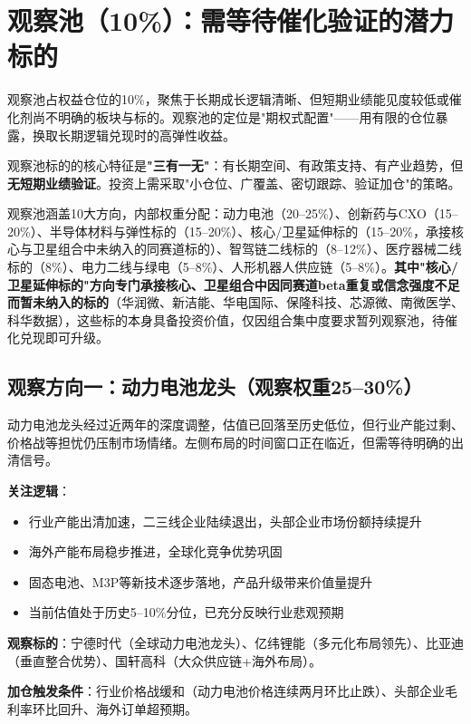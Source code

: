 \section{观察池（10\%）：需等待催化验证的潜力标的}

观察池占权益仓位的10\%，聚焦于长期成长逻辑清晰、但短期业绩能见度较低或催化剂尚不明确的板块与标的。观察池的定位是"期权式配置"——用有限的仓位暴露，换取长期逻辑兑现时的高弹性收益。

观察池标的的核心特征是\textbf{"三有一无"}：有长期空间、有政策支持、有产业趋势，但\textbf{无短期业绩验证}。投资上需采取"小仓位、广覆盖、密切跟踪、验证加仓"的策略。

观察池涵盖10大方向，内部权重分配：动力电池（20--25\%）、创新药与CXO（15--20\%）、半导体材料与弹性标的（15--20\%）、核心/卫星延伸标的（15--20\%，承接核心与卫星组合中未纳入的同赛道标的）、智驾链二线标的（8--12\%）、医疗器械二线标的（8\%）、电力二线与绿电（5--8\%）、人形机器人供应链（5--8\%）。\textbf{其中"核心/卫星延伸标的"方向专门承接核心、卫星组合中因同赛道beta重复或信念强度不足而暂未纳入的标的}（华润微、新洁能、华电国际、保隆科技、芯源微、南微医学、科华数据），这些标的本身具备投资价值，仅因组合集中度要求暂列观察池，待催化兑现即可升级。

\subsection{观察方向一：动力电池龙头（观察权重25--30\%）}

动力电池龙头经过近两年的深度调整，估值已回落至历史低位，但行业产能过剩、价格战等担忧仍压制市场情绪。左侧布局的时间窗口正在临近，但需等待明确的出清信号。

\textbf{关注逻辑}：
\vspace{0.2em}
\begin{itemize}[leftmargin=2em]
\item 行业产能出清加速，二三线企业陆续退出，头部企业市场份额持续提升
\item 海外产能布局稳步推进，全球化竞争优势巩固
\item 固态电池、M3P等新技术逐步落地，产品升级带来价值量提升
\item 当前估值处于历史5--10\%分位，已充分反映行业悲观预期
\end{itemize}

\textbf{观察标的}：宁德时代（全球动力电池龙头）、亿纬锂能（多元化布局领先）、比亚迪（垂直整合优势）、国轩高科（大众供应链+海外布局）。

\textbf{加仓触发条件}：行业价格战缓和（动力电池价格连续两月环比止跌）、头部企业毛利率环比回升、海外订单超预期。

